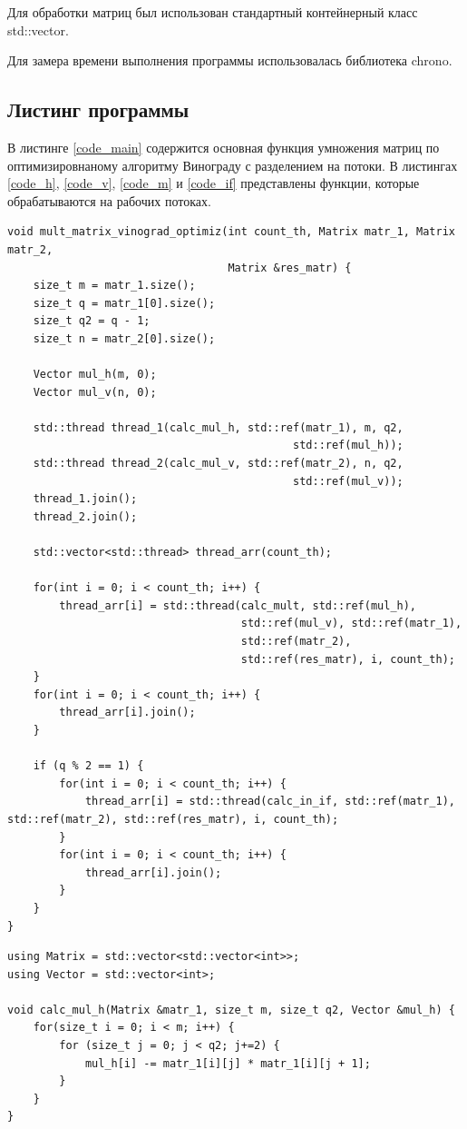 \documentclass[a4paper,14pt]{article}
\begin{document}
	Для обработки матриц был использован стандартный контейнерный класс std::vector.
	
	Для замера времени выполнения программы использовалась библиотека chrono.
	

    
    \subsection{Листинг программы}
	В листинге \ref{code_main} содержится основная функция умножения матриц по оптимизировнаному алгоритму Винограду с разделением на потоки. В листингах \ref{code_h},  \ref{code_v}, \ref{code_m} и \ref{code_if} представлены функции, которые обрабатываются на рабочих потоках. 

		\begin{lstlisting}[label=code_main, caption={Основная функция}]
	void mult_matrix_vinograd_optimiz(int count_th, Matrix matr_1, Matrix matr_2,
                                  Matrix &res_matr) {
    size_t m = matr_1.size();
    size_t q = matr_1[0].size();
    size_t q2 = q - 1;
    size_t n = matr_2[0].size();

    Vector mul_h(m, 0);
    Vector mul_v(n, 0);

    std::thread thread_1(calc_mul_h, std::ref(matr_1), m, q2,
    										std::ref(mul_h));
    std::thread thread_2(calc_mul_v, std::ref(matr_2), n, q2,
    										std::ref(mul_v));
    thread_1.join();
    thread_2.join();

    std::vector<std::thread> thread_arr(count_th);

    for(int i = 0; i < count_th; i++) {
        thread_arr[i] = std::thread(calc_mult, std::ref(mul_h),
                                    std::ref(mul_v), std::ref(matr_1),
                                    std::ref(matr_2),
                                    std::ref(res_matr), i, count_th);
    }
    for(int i = 0; i < count_th; i++) {
        thread_arr[i].join();
    }

    if (q % 2 == 1) {
        for(int i = 0; i < count_th; i++) {
            thread_arr[i] = std::thread(calc_in_if, std::ref(matr_1), std::ref(matr_2), std::ref(res_matr), i, count_th);
        }
        for(int i = 0; i < count_th; i++) {
            thread_arr[i].join();
        }
    }
}
	\end{lstlisting}  
	
	\begin{center}
	\begin{lstlisting}[label=code_h, caption={Функция вычисления горизонтальных произведений}]
using Matrix = std::vector<std::vector<int>>;
using Vector = std::vector<int>;

void calc_mul_h(Matrix &matr_1, size_t m, size_t q2, Vector &mul_h) {
    for(size_t i = 0; i < m; i++) {
        for (size_t j = 0; j < q2; j+=2) {
            mul_h[i] -= matr_1[i][j] * matr_1[i][j + 1];
        }
    }
}


    \end{lstlisting}
    \end{center}  
\end{document}
